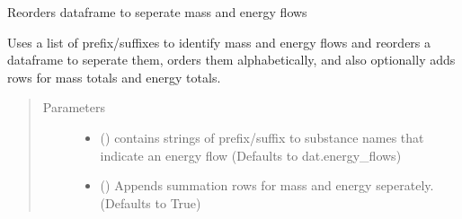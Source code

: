 \documentclass[a4paper,10pt,english]{sphinxmanual}
\begin{document}
\begin{fulllineitems}
\label{\detokenize{io_functions:io_functions.mass_energy_df}}
Reorders dataframe to seperate mass and energy flows

Uses a list of prefix/suffixes to identify mass and energy flows
and reorders a dataframe to seperate them, orders them alphabetically,
and also optionally adds rows for mass totals and energy totals.
\begin{quote}\begin{description}
\item[{Parameters}] \leavevmode\begin{itemize}
\item {} 
 () \textendash{} contains strings of prefix/suffix to substance
names that indicate an energy flow
(Defaults to dat.energy\_flows)

\item {} 
 () \textendash{} Appends summation rows for mass and energy seperately.
(Defaults to True)

\end{itemize}

\end{description}\end{quote}

\end{fulllineitems}

\end{document}
